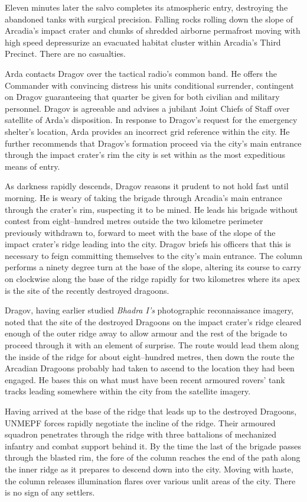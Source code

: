 Eleven minutes later the salvo completes its atmospheric entry, destroying the abandoned tanks with surgical precision. Falling rocks rolling down the slope of Arcadia's impact crater and chunks of shredded airborne permafrost moving with high speed depressurize an evacuated habitat cluster within Arcadia's Third Precinct. There are no casualties.

Arda contacts Dragov over the tactical radio's common band. He offers the Commander with convincing distress his units conditional surrender, contingent on Dragov guaranteeing that quarter be given for both civilian and military personnel. Dragov is agreeable and advises a jubilant Joint Chiefs of Staff over satellite of Arda's disposition. In response to Dragov's request for the emergency shelter's location, Arda provides an incorrect grid reference within the city. He further recommends that Dragov's formation proceed via the city's main entrance through the impact crater's rim the city is set within as the most expeditious means of entry.

As darkness rapidly descends, Dragov reasons it prudent to not hold fast until morning. He is weary of taking the brigade through Arcadia's main entrance through the crater's rim, suspecting it to be mined. He leads his brigade without contest from eight--hundred metres outside the two kilometre perimeter previously withdrawn to, forward to meet with the base of the slope of the impact crater's ridge leading into the city. Dragov briefs his officers that this is necessary to feign committing themselves to the city's main entrance. The column performs a ninety degree turn at the base of the slope, altering its course to carry on clockwise along the base of the ridge rapidly for two kilometres where its apex is the site of the recently destroyed dragoons.

Dragov, having earlier studied {\it Bhadra I's} photographic reconnaissance imagery, noted that the site of the destroyed Dragoons on the impact crater's ridge cleared enough of the outer ridge away to allow armour and the rest of the brigade to proceed through it with an element of surprise. The route would lead them along the inside of the ridge for about eight--hundred metres, then down the route the Arcadian Dragoons probably had taken to ascend to the location they had been engaged. He bases this on what must have been recent armoured rovers' tank tracks leading somewhere within the city from the satellite imagery.

Having arrived at the base of the ridge that leads up to the destroyed Dragoons, UNMEPF forces rapidly negotiate the incline of the ridge. Their armoured squadron penetrates through the ridge with three battalions of mechanized infantry and combat support behind it. By the time the last of the brigade passes through the blasted rim, the fore of the column reaches the end of the path along the inner ridge as it prepares to descend down into the city. Moving with haste, the column releases illumination flares over various unlit areas of the city. There is no sign of any settlers.

